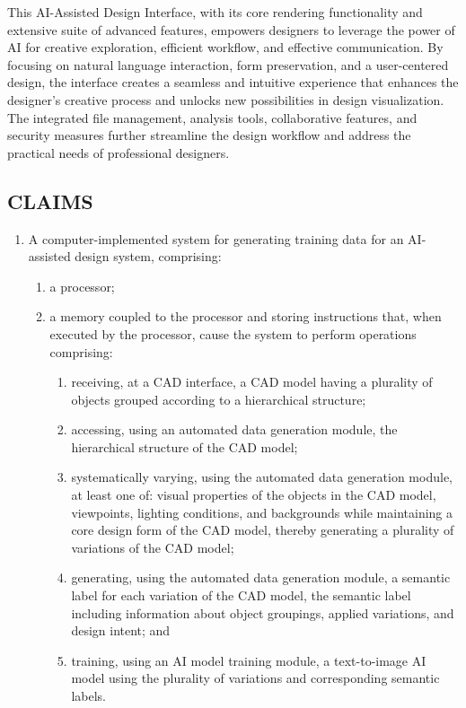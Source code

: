 \documentclass[12pt]{report}
\begin{document}
This AI-Assisted Design Interface, with its core rendering functionality and extensive suite of advanced features, empowers designers to leverage the power of AI for creative exploration, efficient workflow, and effective communication. By focusing on natural language interaction, form preservation, and a user-centered design, the interface creates a seamless and intuitive experience that enhances the designer's creative process and unlocks new possibilities in design visualization. The integrated file management, analysis tools, collaborative features, and security measures further streamline the design workflow and address the practical needs of professional designers.

\begin{center}
    \section{CLAIMS}
    \begin{enumerate}
    \item A computer-implemented system for generating training data for an AI-assisted design system, comprising:
       \begin{enumerate}
           \item a processor;
           \item a memory coupled to the processor and storing instructions that, when executed by the processor, cause the system to perform operations comprising: 
           \begin{enumerate}
               \item receiving, at a CAD interface, a CAD model having a plurality of objects grouped according to a hierarchical structure;
               \item accessing, using an automated data generation module, the hierarchical structure of the CAD model;
               \item systematically varying, using the automated data generation module, at least one of: visual properties of the objects in the CAD model,  viewpoints, lighting conditions, and backgrounds while maintaining a core design form of the CAD model, thereby generating a plurality of variations of the CAD model;
               \item generating, using the automated data generation module, a semantic label for each variation of the CAD model, the semantic label including information about object groupings, applied variations, and design intent; and 
               \item training, using an AI model training module, a text-to-image AI model using the plurality of variations and corresponding semantic labels.
           \end{enumerate}
       \end{enumerate}
    

\end{enumerate}
\end{center}
\end{document}
